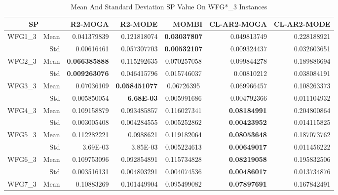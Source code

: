 \begin{table*}[htbp]
  \centering
  \caption{Mean And Standard Deviation SP Value On WFG*\_3 Instances}
    \begin{tabular}{rrrrrrr}
    \toprule
    \multicolumn{2}{c}{SP} & R2-MOGA & R2-MODE & MOMBI & CL-AR2-MOGA & CL-AR2-MODE \\
    \midrule
    \multirow{2}[0]{*}{WFG1\_3} & Mean  & 0.041379839 & 0.121818074 & \multicolumn{1}{c}{\textbf{0.03037807}} & 0.049813749 & 0.228188921 \\
          & Std   & 0.00616461 & 0.057307703 & \multicolumn{1}{c}{\textbf{0.00532107}} & 0.009324437 & 0.032603651 \\
    \multirow{2}[0]{*}{WFG2\_3} & Mean  & \textbf{0.066385888} & 0.115292635 & \multicolumn{1}{c}{0.070257058} & 0.099844278 & 0.189886694 \\
          & Std   & \textbf{0.009263076} & 0.046415796 & \multicolumn{1}{c}{0.015746037} & 0.00810212 & 0.038084191 \\
    \multirow{2}[0]{*}{WFG3\_3} & Mean  & 0.07036109 & \textbf{0.058451077} & \multicolumn{1}{c}{0.06726395} & 0.069966457 & 0.108263373 \\
          & Std   & 0.005850054 & \textbf{6.68E-03} & \multicolumn{1}{c}{0.005991686} & 0.004792366 & 0.011104932 \\
    \multirow{2}[0]{*}{WFG4\_3} & Mean  & 0.109158879 & 0.093485857 & \multicolumn{1}{c}{0.116027341} & \textbf{0.08184991} & 0.204800864 \\
          & Std   & 0.003005408 & 0.004284555 & \multicolumn{1}{c}{0.005252862} & \textbf{0.00423952} & 0.014115825 \\
    \multirow{2}[0]{*}{WFG5\_3} & Mean  & 0.112282221 & 0.0988621 & \multicolumn{1}{c}{0.119182064} & \textbf{0.08053648} & 0.187073762 \\
          & Std   & 3.69E-03 & 3.85E-03 & \multicolumn{1}{c}{0.005224613} & \textbf{0.00649017} & 0.011456222 \\
    \multirow{2}[0]{*}{WFG6\_3} & Mean  & 0.109753096 & 0.092854891 & \multicolumn{1}{c}{0.115734828} & \textbf{0.08219058} & 0.195832506 \\
          & Std   & 0.003516131 & 0.004803291 & \multicolumn{1}{c}{0.004074536} & \textbf{0.00486017} & 0.013734876 \\
    \multirow{2}[0]{*}{WFG7\_3} & Mean  & 0.10883269 & 0.101449904 & \multicolumn{1}{c}{0.095499082} & \textbf{0.07897691} & 0.167842491 \\

\end{tabular}
\end{table*}
